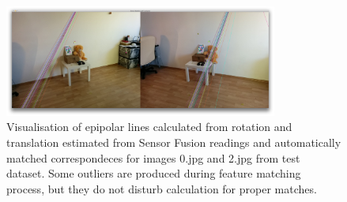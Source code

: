 \begin{figure}[h!]
    \centering
    \includegraphics[width=0.8\textwidth]{f_02_sensor}
    \caption[Visualisation of epipolar lines calculated from rotation and translation estimated from Sensor Fusion readings - 2nd example]{Visualisation of epipolar lines calculated from rotation and translation estimated from Sensor Fusion readings and automatically matched correspondeces for images 0.jpg and 2.jpg from test dataset. Some outliers are produced during feature matching process, but they do not disturb calculation for proper matches.}
    \label{fig:f_02_sensor}
\end{figure}
\clearpage


